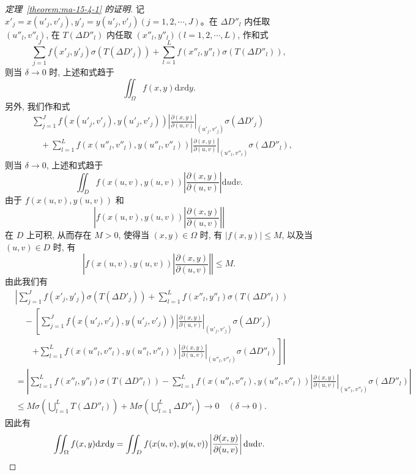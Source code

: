 \begin{proof}[{定理~\ref{theorem:ma-15-4-1} 的证明}]
记 $x'_j=x(u'_j,v'_j), y'_j=y(u'_j,v'_j)(j=1,2,\cdots,J)$。在 $\Delta D''_l$ 内任取 $(u''_l,v''_l)$, 在 $T(\Delta D''_l)$ 内任取 $(x''_l,y''_l)(l=1,2,\cdots,L)$, 作和式
\begin{equation}
  \sum_{j=1}^J f(x'_j,y'_j)\sigma(T(\Delta D'_j))
  +\sum_{l=1}^L f(x''_l,y''_l)\sigma(T(\Delta D''_l)),
  \label{eq:ma-15-4-1}
\end{equation}
则当 $\delta\to0$ 时, 上述和式趋于
\[
  \iint_\Omega f(x,y)\mathrm dx\mathrm dy.
\]
另外, 我们作和式
\begin{equation}
\begin{aligned}
  &\sum_{j=1}^J f(x(u'_j,v'_j),y(u'_j,v'_j))
  \left|\frac{\partial(x,y)}{\partial(u,v)}\right|_{(u'_j,v'_j)}
  \sigma(\Delta D'_j)\\
  &\quad+\sum_{l=1}^L f(x(u''_l,v''_l),y(u''_l,v''_l))
  \left|\frac{\partial(x,y)}{\partial(u,v)}\right|_{(u''_l,v''_l)}
  \sigma(\Delta D''_l),
\end{aligned}
  \label{eq:ma-15-4-2}
\end{equation}
则当 $\delta\to0$, 上述和式趋于
\[
  \iint_D f(x(u,v),y(u,v))
  \left|\frac{\partial(x,y)}{\partial(u,v)}\right|\mathrm du\mathrm dv.
\]
由于 $f(x(u,v),y(u,v))$ 和
\[
  \left|f(x(u,v),y(u,v))\left|\frac{\partial(x,y)}{\partial(u,v)}\right|\right|
\]
在 $D$ 上可积, 从而存在 $M>0$, 使得当 $(x,y)\in\Omega$ 时, 有 $|f(x,y)|\leqslant M$, 以及当 $(u,v)\in D$ 时, 有
\[
  \left|f(x(u,v),y(u,v))\left|\frac{\partial(x,y)}{\partial(u,v)}\right|\right|\leqslant M.
\]
由此我们有
\[
\begin{aligned}
  &\left|
  \sum_{j=1}^J f(x'_j,y'_j)\sigma(T(\Delta D'_j))
  +\sum_{l=1}^L f(x''_l,y''_l)\sigma(T(\Delta D''_l))\right.\\
  &\quad-\left[
  \sum_{j=1}^J f(x(u'_j,v'_j),y(u'_j,v'_j))
  \left|\frac{\partial(x,y)}{\partial(u,v)}\right|_{(u'_j,v'_j)}
  \sigma(\Delta D'_j)\right.\\
  &\qquad\left.\left.
  +\sum_{l=1}^L f(x(u''_l,v''_l),y(u''_l,v''_l))
  \left|\frac{\partial(x,y)}{\partial(u,v)}\right|_{(u''_l,v''_l)}
  \sigma(\Delta D''_l)\right]\right|\\
  &=\left|
  \sum_{l=1}^L f(x''_l,y''_l)\sigma(T(\Delta D''_l))
  -\sum_{l=1}^L f(x(u''_l,v''_l),y(u''_l,v''_l))
  \left|\frac{\partial(x,y)}{\partial(u,v)}\right|_{(u''_l,v''_l)}
  \sigma(\Delta D''_l)\right|\\
  &\leqslant M\sigma\left(\bigcup_{l=1}^L T(\Delta D''_l)\right)
  +M\sigma\left(\bigcup_{l=1}^L\Delta D''_l\right)\to0\quad(\delta\to0).
\end{aligned}
\]
因此有
\[
  \iint_\Omega f(x,y)\mathrm dx\mathrm dy
  =\iint_D f(x(u,v),y(u,v))
  \left|\frac{\partial(x,y)}{\partial(u,v)}\right|\mathrm du\mathrm dv.
\qedhere
\]
\end{proof}


